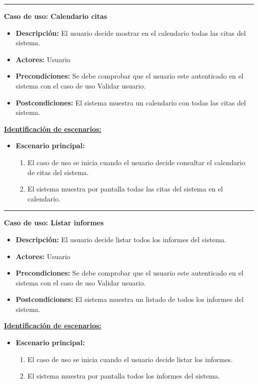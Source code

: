 \smallskip
\hrule height 1pt
\smallskip

\textbf{Caso de uso: Calendario citas}
\begin{itemize}\renewcommand{\labelitemi}{$\cdot$}
 \item \textbf{Descripción:} El usuario decide mostrar en el calendario todas las citas del sistema.
  \item \textbf{Actores:} Usuario
  \item \textbf{Precondiciones:} Se debe comprobar que el usuario este autenticado en el sistema con el caso de uso Validar usuario.
  \item \textbf{Postcondiciones:} El sistema muestra un calendario con todas las citas del sistema.
\end{itemize}
\underline{\textbf{Identificación de escenarios:}}
\begin{itemize}\renewcommand{\labelitemi}{$\circ$}
 \item \textbf{Escenario principal:}
         \begin{enumerate}
          \item El caso de uso se inicia cuando el usuario decide consultar el calendario de citas del sistema.
	  \item El sistema muestra por pantalla todas las citas del sistema en el calendario.
         \end{enumerate}
\end{itemize}

\smallskip
\hrule height 1pt
\smallskip
\textbf{Caso de uso: Listar informes}
\begin{itemize}\renewcommand{\labelitemi}{$\cdot$}
 \item \textbf{Descripción:} El usuario decide listar todos los informes del sistema.
  \item \textbf{Actores:} Usuario
  \item \textbf{Precondiciones:} Se debe comprobar que el usuario este autenticado en el sistema con el caso de uso Validar usuario.
  \item \textbf{Postcondiciones:} El sistema muestra un listado de todos los informes del sistema.
\end{itemize}
\underline{\textbf{Identificación de escenarios:}}
\begin{itemize}\renewcommand{\labelitemi}{$\circ$}
 \item \textbf{Escenario principal:}
         \begin{enumerate}
          \item El caso de uso se inicia cuando el usuario decide listar los informes.
	  \item El sistema muestra por pantalla todos los informes del sistema.
         \end{enumerate}
\end{itemize}

